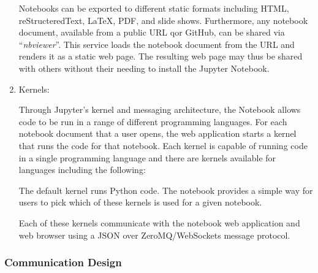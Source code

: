 \begin{enumerate}
  Notebooks can be exported to different static formats including HTML, reStructeredText,
  LaTeX, PDF, and slide shows. Furthermore, any notebook document, available from a public
  URL qor GitHub, can be shared via ``\textit{nbviewer}''. This service loads the notebook
  document from the URL and renders it as a static web page. The resulting web page may
  thus be shared with others without their needing to install the Jupyter Notebook.

\item Kernels:
 
  Through Jupyter's kernel and messaging architecture, the Notebook allows code to be run
  in a range of different programming languages. For each notebook document that a user
  opens, the web application starts a kernel that runs the code for that notebook. Each
  kernel is capable of running code in a single programming language and there are kernels
  available for languages including the following:


  The default kernel runs Python code.  The notebook provides a simple way for users to
  pick which of these kernels is used for a given notebook.

  Each of these kernels communicate with the notebook web application and web browser
  using a JSON over ZeroMQ/WebSockets message protocol.
\end{enumerate}

\subsubsection{Communication Design}

